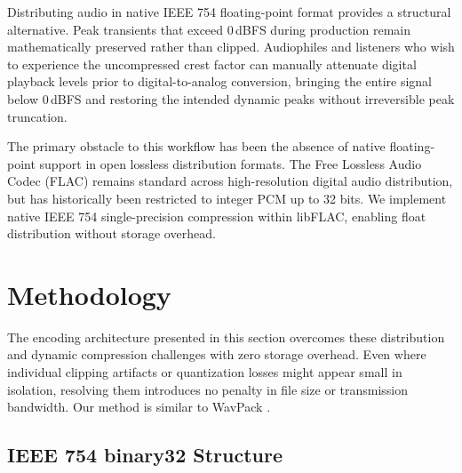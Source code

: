 \documentclass[10pt,twocolumn]{article}
\begin{document}
Distributing audio in native IEEE 754 floating-point format provides a structural alternative. Peak transients that exceed 0\,dBFS during production remain mathematically preserved rather than clipped. Audiophiles and listeners who wish to experience the uncompressed crest factor can manually attenuate digital playback levels prior to digital-to-analog conversion, bringing the entire signal below 0\,dBFS and restoring the intended dynamic peaks without irreversible peak truncation.

The primary obstacle to this workflow has been the absence of native floating-point support in open lossless distribution formats. The Free Lossless Audio Codec (FLAC) \cite{flac} remains standard across high-resolution digital audio distribution, but has historically been restricted to integer PCM up to 32 bits. We implement native IEEE 754 single-precision compression within libFLAC, enabling float distribution without storage overhead.

\section{Methodology}
The encoding architecture presented in this section overcomes these distribution and dynamic compression challenges with zero storage overhead. Even where individual clipping artifacts or quantization losses might appear small in isolation, resolving them introduces no penalty in file size or transmission bandwidth. Our method is similar to WavPack \cite{WavPack}.

\subsection{IEEE 754 binary32 Structure}
\end{document}
